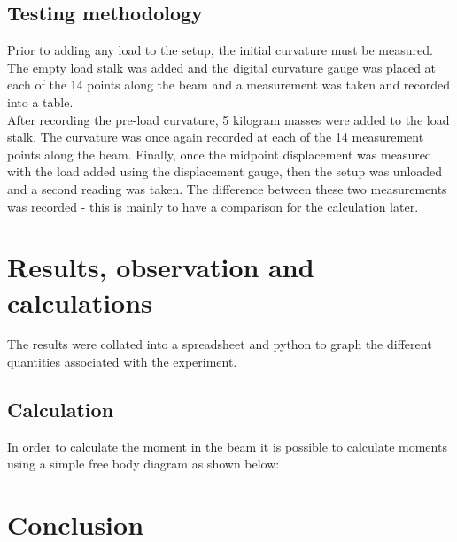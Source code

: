 \documentclass[12pt]{article}
\begin{document}
        \subsection{Testing methodology}
            Prior to adding any load to the setup, the initial curvature must be measured. The empty load stalk was added and the digital curvature gauge was 
            placed at each of the 14 points along the beam and a measurement was taken and recorded into a table. \\ After recording the pre-load curvature, 5 kilogram masses
            were added to the load stalk. The curvature was once again recorded at each of the 14 measurement points along the beam. Finally, once the midpoint displacement
            was measured with the load added using the displacement gauge, then the setup was unloaded and a second reading was taken. The difference between these
            two measurements was recorded - this is mainly to have a comparison for the calculation later.
    \section{Results, observation and calculations}
        The results were collated into a spreadsheet and python to graph the different quantities associated with the experiment.
        \subsection{Calculation}
            In order to calculate the moment in the beam it is possible to calculate moments using a simple free body diagram as shown below:
            \begin{figure}[H]
            \end{figure}
    \section{Conclusion}
\end{document}
